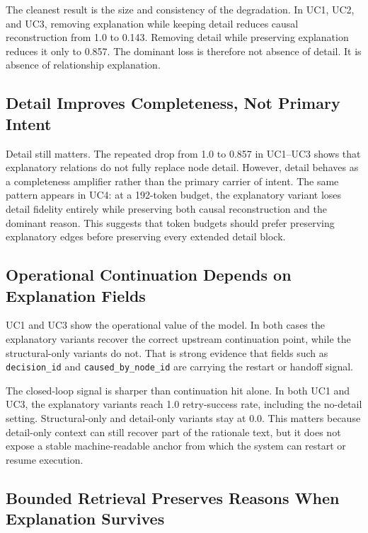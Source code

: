 \documentclass[11pt]{article}
\begin{document}
The cleanest result is the size and consistency of the degradation. In UC1,
UC2, and UC3, removing explanation while keeping detail reduces causal
reconstruction from \mbox{1.0} to \mbox{0.143}. Removing detail while
preserving explanation reduces it only to \mbox{0.857}. The dominant loss is
therefore not absence of detail. It is absence of relationship explanation.

\subsection{Detail Improves Completeness, Not Primary Intent}

Detail still matters. The repeated drop from \mbox{1.0} to \mbox{0.857} in
UC1--UC3 shows that explanatory relations do not fully replace node detail.
However, detail behaves as a completeness amplifier rather than the primary
carrier of intent. The same pattern appears in UC4: at a \mbox{192}-token
budget, the explanatory variant loses detail fidelity entirely while
preserving both causal reconstruction and the dominant reason. This suggests
that token budgets should prefer preserving explanatory edges before
preserving every extended detail block.

\subsection{Operational Continuation Depends on Explanation Fields}

UC1 and UC3 show the operational value of the model. In both cases the
explanatory variants recover the correct upstream continuation point, while
the structural-only variants do not. That is strong evidence that fields such
as \texttt{decision\_id} and \texttt{caused\_by\_node\_id} are carrying the
restart or handoff signal.

The closed-loop signal is sharper than continuation hit alone. In both UC1
and UC3, the explanatory variants reach \mbox{1.0} retry-success rate,
including the no-detail setting. Structural-only and detail-only variants stay
at \mbox{0.0}. This matters because detail-only context can still recover part
of the rationale text, but it does not expose a stable machine-readable anchor
from which the system can restart or resume execution.

\subsection{Bounded Retrieval Preserves Reasons When Explanation Survives}
\end{document}
